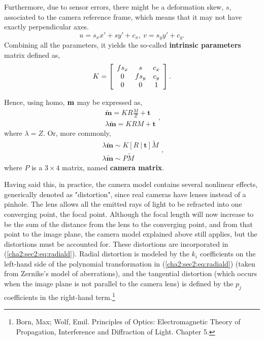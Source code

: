 \begin{enumerate}
	Furthermore, due to sensor errors, there might be a deformation skew, $s$, associated to the camera reference frame, which means that it may not have exactly perpendicular axes.
	\begin{equation}
	\label{cha2:sec2:eq:trisimilar}
	u = s_x x' + sy' + c_x, \ v = s_y y' + c_y.
	\end{equation}
	Combining all the parameters, it yields the so-called \textbf{intrinsic parameters} matrix defined as,
	\begin{equation}
	\label{sec2:eq:kmatrix}
	K = \left[ 
	\begin{array} { c c c } 
	f s_x & s     & c_x \\ 
	0 	  & f s_y & c_y \\ 
	0     & 0     & 1   
	\end{array} 
	\right].
	\end{equation}
\end{enumerate}
Hence, using \gls{homo}, $\bf m$ may be expressed as,
\begin{equation}
\begin{array} { l } 
\mathbf{\widetilde{m}} = K R \frac{M}{Z} + \mathbf{t} \\
\lambda \mathbf{\widetilde{m}} = KR M +  \mathbf{t} 
\end{array},
\end{equation}
where $\lambda = Z$. Or, more commonly, 
\begin{equation}
\begin{array} { l } { \lambda \mathbf{\widetilde{m}} \sim K [ R \ | \ \mathbf{t} ] \widetilde { M } } \\ { \lambda \mathbf{\widetilde{ m }} \sim P \widetilde { M } } \end{array},
\end{equation}
where $P$ is a $3\times4$ matrix, named \textbf{camera matrix}.
	
Having said this, in practice, the camera model contains several nonlinear effects, generically denoted as "distortion", since real cameras have lenses instead of a pinhole. The lens allows all the emitted rays of light to be refracted into one converging point, the focal point. Although the focal length will now increase to be the sum of the distance from the lens to the converging point, and from that point to the image plane, the camera model explained above still applies, but the distortions must be accounted for. These distortions are incorporated in (\ref{cha2:sec2:eq:radiald}). Radial distortion is modeled by the $k_i$ coefficients on the left-hand side of the polynomial transformation in (\ref{cha2:sec2:eq:radiald}) (taken from Zernike's model of aberrations), and the tangential distortion (which occurs when the image plane is not parallel to the camera lens) is defined by the $p_j$ coefficients in the right-hand term.\footnote{Born, Max; Wolf, Emil. Principles of Optics: Electromagnetic Theory of Propagation, Interference and Diffraction of Light. Chapter 5.} 

